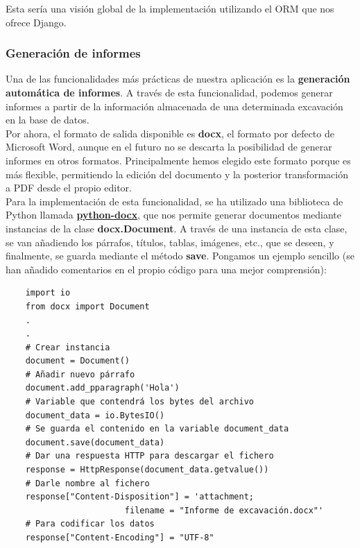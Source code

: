     Esta sería una visión global de la implementación utilizando el ORM que nos ofrece Django.

\subsubsection{Generación de informes}
Una de las funcionalidades más prácticas de nuestra aplicación es la \textbf{generación
automática de informes}. A través de esta funcionalidad, podemos generar informes a partir
de la información almacenada de una determinada excavación en la base de datos. \\

Por ahora, el formato de salida disponible es \textbf{docx}, el formato por defecto de
Microsoft Word, aunque en el futuro no se descarta la posibilidad de generar informes
en otros formatos. Principalmente hemos elegido este formato porque es más flexible,
permitiendo la edición del documento y la posterior transformación a PDF desde el propio
editor. \\

Para la implementación de esta funcionalidad, se ha utilizado una biblioteca de Python
llamada \href{https://python-docx.readthedocs.io/en/latest/}{\textbf{python-docx}}, que nos
permite generar documentos mediante instancias de la clase \textbf{docx.Document}. A
través de una instancia de esta clase, se van añadiendo los párrafos, títulos, tablas,
imágenes, etc., que se deseen, y finalmente, se guarda mediante el método \textbf{save}.
Pongamos un ejemplo sencillo (se han añadido comentarios en el propio código para una mejor
comprensión):


\begin{verbatim}
    import io
    from docx import Document
    .
    .
    # Crear instancia
    document = Document()
    # Añadir nuevo párrafo
    document.add_pparagraph('Hola')
    # Variable que contendrá los bytes del archivo
    document_data = io.BytesIO()
    # Se guarda el contenido en la variable document_data
    document.save(document_data)
    # Dar una respuesta HTTP para descargar el fichero
    response = HttpResponse(document_data.getvalue())
    # Darle nombre al fichero
    response["Content-Disposition"] = 'attachment;
                        filename = "Informe de excavación.docx"'
    # Para codificar los datos
    response["Content-Encoding"] = "UTF-8"
\end{verbatim}

